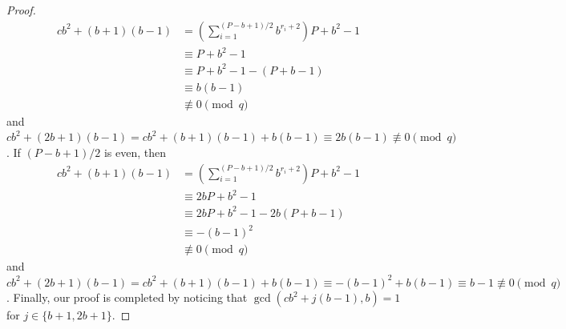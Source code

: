 \documentclass[10pt,a4paper]{amsart}
\begin{document}
\begin{proof}
\begin{align*}
    cb^2+(b+1)(b-1)&=\left(\sum_{i=1}^{(P-b+1)/2}b^{r_i+2}\right)P+b^2-1\\
    &\equiv P+b^2-1\\
    &\equiv P+b^2-1-(P+b-1)\\
    &\equiv b(b-1)\\
    &\not\equiv0\pmod{q}
\end{align*}
and $cb^2+(2b+1)(b-1)=cb^2+(b+1)(b-1)+b(b-1)\equiv2b(b-1)\not\equiv0\pmod{q}$. If $(P-b+1)/2$ is even, then 
\begin{align*}
    cb^2+(b+1)(b-1)
    &=\left(\sum_{i=1}^{(P-b+1)/2}b^{r_i+2}\right)P+b^2-1\\
    &\equiv 2bP+b^2-1\\
    &\equiv 2bP+b^2-1-2b(P+b-1)\\
    &\equiv-(b-1)^2\\
    &\not\equiv0\pmod{q}
\end{align*}
and $cb^2+(2b+1)(b-1)=cb^2+(b+1)(b-1)+b(b-1)\equiv-(b-1)^2+b(b-1)\equiv b-1\not\equiv0\pmod{q}$. Finally, our proof is completed by noticing that $\gcd(cb^2+j(b-1),b)=1$ for $j\in\{b+1,2b+1\}$.
\end{proof}
\end{document}
